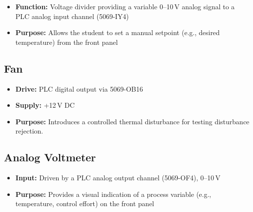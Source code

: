 \documentclass[main.tex]{subfiles}
\begin{document}
\begin{itemize}
    \item \textbf{Function:} Voltage divider providing a variable 0--10\,V analog signal to a PLC analog input channel (5069-IY4)
    \item \textbf{Purpose:} Allows the student to set a manual setpoint (e.g., desired temperature) from the front panel
\end{itemize}

\subsection{Fan}

\begin{itemize}
    \item \textbf{Drive:} PLC digital output via 5069-OB16
    \item \textbf{Supply:} +12\,V DC
    \item \textbf{Purpose:} Introduces a controlled thermal disturbance for testing disturbance rejection.
\end{itemize}

\subsection{Analog Voltmeter}

\begin{itemize}
    \item \textbf{Input:} Driven by a PLC analog output channel (5069-OF4), 0--10\,V
    \item \textbf{Purpose:} Provides a visual indication of a process variable (e.g., temperature, control effort) on the front panel
\end{itemize}
\end{document}
